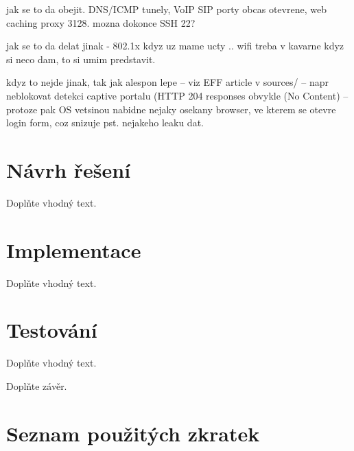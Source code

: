 \documentclass[thesis=M,czech]{FITthesis}[2012/10/20]
\begin{document}
jak se to da obejit. DNS/ICMP tunely, VoIP SIP porty obcas otevrene, web caching proxy 3128. mozna dokonce SSH 22?

jak se to da delat jinak - 802.1x kdyz uz mame ucty .. wifi treba v kavarne kdyz si neco dam, to si umim predstavit.

kdyz to nejde jinak, tak jak alespon lepe -- viz EFF article v sources/ -- napr neblokovat detekci captive portalu (HTTP 204 responses obvykle (No Content) -- protoze pak OS vetsinou nabidne nejaky osekany browser, ve kterem se otevre login form, coz snizuje pst. nejakeho leaku dat.





\chapter{Návrh řešení}

Doplňte vhodný text.

\chapter{Implementace}

Doplňte vhodný text.

\chapter{Testování}

Doplňte vhodný text.


\begin{conclusion}
	Doplňte závěr.
	
\end{conclusion}




\appendix

\chapter{Seznam použitých zkratek}
\end{document}
